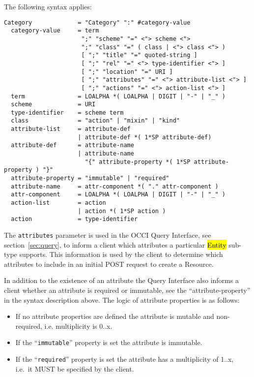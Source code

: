 \documentclass[10pt,a4paper]{article}
\begin{document}
The following syntax applies:

\begin{verbatim}
Category             = "Category" ":" #category-value
  category-value     = term
                      ";" "scheme" "=" <"> scheme <">
                      ";" "class" "=" ( class | <"> class <"> )
                      [ ";" "title" "=" quoted-string ]
                      [ ";" "rel" "=" <"> type-identifier <"> ]
                      [ ";" "location" "=" URI ]
                      [ ";" "attributes" "=" <"> attribute-list <"> ]
                      [ ";" "actions" "=" <"> action-list <"> ]
  term               = LOALPHA *( LOALPHA | DIGIT | "-" | "_" )
  scheme             = URI
  type-identifier    = scheme term
  class              = "action" | "mixin" | "kind"
  attribute-list     = attribute-def
                     | attribute-def *( 1*SP attribute-def)
  attribute-def      = attribute-name
                     | attribute-name
                       "{" attribute-property *( 1*SP attribute-property ) "}"
  attribute-property = "immutable" | "required"
  attribute-name     = attr-component *( "." attr-component )
  attr-component     = LOALPHA *( LOALPHA | DIGIT | "-" | "_" )
  action-list        = action
                     | action *( 1*SP action )
  action             = type-identifier
\end{verbatim}

The {\tt attributes} parameter is used in the OCCI Query Interface,
see section~\ref{sec:query}, to inform a client which attributes a
particular \hl{Entity} sub-type supports. This information is used by
the client to determine which attributes to include in an initial POST
request to create a Resource.

In addition to the existence of an attribute the Query Interface also
informs a client whether an attribute is required or immutable, see
the ``attribute-property'' in the syntax description above. The logic
of attribute properties is as follows:

\begin{itemize} 
  \item If no attribute properties are defined the attribute is
    mutable and non-required, i.e. multiplicity is 0..x.
  \item If the ``{\tt immutable}'' property is set the attribute is
    immutable.
  \item If the ``{\tt required}'' property is set the attribute has a
    multiplicity of 1..x, i.e.~it MUST be specified by the client.
\end{itemize}
\end{document}
